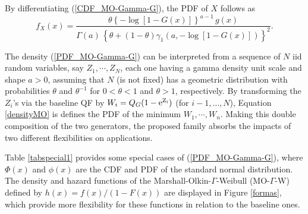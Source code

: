 \documentclass[twoside,leqno,11pt]{article}
\begin{document}
By differentiating (\ref{CDF_MO-Gamma-G}), the PDF of $X$ follows as
\begin{equation}\label{PDF_MO-Gamma-G}
f_{X}(x)=\frac{\theta  \left\{ -\log[1-G(x)] \right\}^{a-1}\, g(x)}{\Gamma(a)\,\left\{\theta+(1-\theta)\gamma_1\left( a, -\log \left[1-G(x)\right]\right)\right\}^{2}}.
\end{equation}

The density (\ref{PDF_MO-Gamma-G}) can be interpreted from a sequence of $N$ iid random variables, say $Z_1,\cdots,Z_N$,
each one having a gamma density unit scale and shape $a>0$, assuming that $N$ (is not fixed) has a geometric 
distribution with probabilities $\theta$ and $\theta^{-1}$ for $0<\theta<1$ and $\theta>1$,
respectively. By transforming the $Z_i$'s via the baseline QF by $W_i=Q_G(1-\rm{e}^{Z_i})$
(for $i-1,\ldots,N$), Equation \eqref{densityMO} is defines the PDF of the minimum $W_1,\cdots,W_n$. 
Making this double composition of the two generators, the proposed family absorbs the impacts of two different flexibilities 
on applications. 


Table \ref{tabspecial1} provides some special cases of (\ref{PDF_MO-Gamma-G}), where
$\Phi(x)$ and $\phi(x)$ are the CDF and PDF of the standard normal distribution. The density and hazard functions
of the Marshall-Olkin-$\Gamma$-Weibull (MO-$\Gamma$-W) defined by $h(x) = f(x)/(1-F(x))$ are displayed in Figure \ref{formas}, which provide
more flexibility for these functions in relation to the baseline ones.

\vspace{0.6cm}

\end{document}
